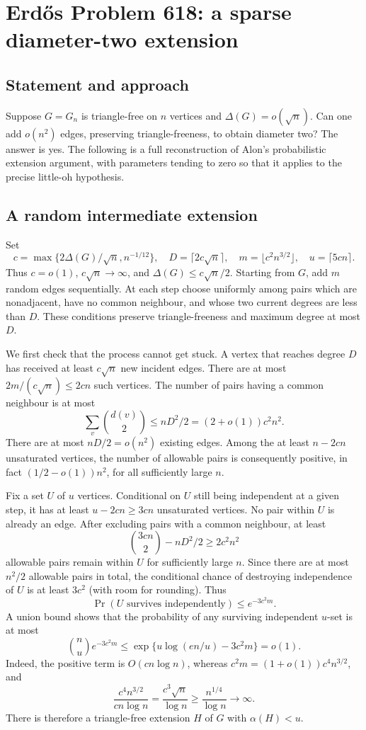 \section{Erd\H{o}s Problem 618: a sparse diameter-two extension}
\subsection*{Statement and approach}
Suppose $G=G_n$ is triangle-free on $n$ vertices and $\Delta(G)=o(\sqrt n)$. Can one add $o(n^2)$ edges, preserving triangle-freeness, to obtain diameter two? The answer is yes. The following is a full reconstruction of Alon's probabilistic extension argument, with parameters tending to zero so that it applies to the precise little-oh hypothesis.

\subsection*{A random intermediate extension}
Set
\[
 c=\max\{2\Delta(G)/\sqrt n,n^{-1/12}\},\quad
 D=\lceil2c\sqrt n\rceil,\quad
 m=\lfloor c^2n^{3/2}\rfloor,\quad u=\lceil5cn\rceil.
\]
Thus $c=o(1)$, $c\sqrt n\to\infty$, and $\Delta(G)\le c\sqrt n/2$.
Starting from $G$, add $m$ random edges sequentially. At each step choose uniformly among pairs which are nonadjacent, have no common neighbour, and whose two current degrees are less than $D$.
These conditions preserve triangle-freeness and maximum degree at most $D$.

We first check that the process cannot get stuck. A vertex that reaches degree $D$ has received at least $c\sqrt n$ new incident edges. There are at most $2m/(c\sqrt n)\le2cn$ such vertices. The number of pairs having a common neighbour is at most
\[
 \sum_v\binom{d(v)}2\le nD^2/2=(2+o(1))c^2n^2.
\]
There are at most $nD/2=o(n^2)$ existing edges. Among the at least $n-2cn$ unsaturated vertices, the number of allowable pairs is consequently positive, in fact $(1/2-o(1))n^2$, for all sufficiently large $n$.

Fix a set $U$ of $u$ vertices. Conditional on $U$ still being independent at a given step, it has at least $u-2cn\ge3cn$ unsaturated vertices. No pair within $U$ is already an edge. After excluding pairs with a common neighbour, at least
\[
 \binom{3cn}{2}-nD^2/2\ge2c^2n^2
\]
allowable pairs remain within $U$ for sufficiently large $n$. Since there are at most $n^2/2$ allowable pairs in total, the conditional chance of destroying independence of $U$ is at least $3c^2$ (with room for rounding). Thus
\[
 \Pr(U\text{ survives independently})\le e^{-3c^2m}.
\]
A union bound shows that the probability of any surviving independent $u$-set is at most
\[
 \binom nu e^{-3c^2m}
 \le\exp\{u\log(en/u)-3c^2m\}=o(1).
\]
Indeed, the positive term is $O(cn\log n)$, whereas $c^2m=(1+o(1))c^4n^{3/2}$, and
\[
 \frac{c^4n^{3/2}}{cn\log n}
 =\frac{c^3\sqrt n}{\log n}
 \ge\frac{n^{1/4}}{\log n}\longrightarrow\infty.
\]
There is therefore a triangle-free extension $H$ of $G$ with $\alpha(H)<u$.

